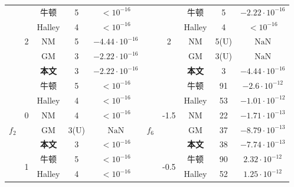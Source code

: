 \begin{center}
\begin{longtable}[!htbp]{c|c|ccc|c|c|ccc}
     \cline{2-5}\cline{7-10}
        & 	\multirow{5}{*}{2}  & 	牛顿  & 	5  & 	$< 10^{-16}$&	   & 	\multirow{5}{*}{2}  & 	牛顿  & 	5  & 	$-2.22 \cdot 10^{-16}$\\
     
        & 	   & 	Halley  & 	4  & 	$< 10^{-16}$&	   & 	   & 	Halley  & 	4  & 	$< 10^{-16}$\\
     
        & 	   & 	NM  & 	5  & 	$-4.44 \cdot 10^{-16}$&	   & 	   & 	NM  & 	5(U)  & 	$\text{NaN}$\\
     
        & 	   & 	GM  & 	3  & 	$-2.22 \cdot 10^{-16}$&	   & 	   & 	GM  & 	3(U)  & 	$\text{NaN}$\\
     
        & 	   & 	\textbf{本文}  & 	3  & 	$-2.22 \cdot 10^{-16}$&	   & 	   & 	\textbf{本文}  & 	3  & 	$-4.44 \cdot 10^{-16}$\\
     
     \cline{2-5}\cline{7-10}
     \hline


    \multirow{10}{*}{$f_2$} & 	\multirow{5}{*}{0}  & 	牛顿  & 	5  & 	$< 10^{-16}$&	\multirow{10}{*}{$f_6$}   & 	\multirow{5}{*}{-1.5}  & 	牛顿  & 	91  & 	$-2.6 \cdot 10^{-12}$\\

    & 	   & 	Halley  & 	4  & 	$< 10^{-16}$&	   & 	   & 	Halley  & 	53  & 	$-1.01 \cdot 10^{-12}$\\
 
    & 	   & 	NM  & 	4  & 	$< 10^{-16}$&	   & 	   & 	NM  & 	22  & 	$-1.71 \cdot 10^{-13}$\\
 
    & 	   & 	GM  & 	3(U)  & 	$\text{NaN}$&	   & 	   & 	GM  & 	37  & 	$-8.79 \cdot 10^{-13}$\\
 
    & 	   & 	\textbf{本文}  & 	3  & 	$< 10^{-16}$&	   & 	   & 	\textbf{本文}  & 	38  & 	$-7.74 \cdot 10^{-13}$\\
 
 \cline{2-5}\cline{7-10}
    & 	\multirow{5}{*}{1}  & 	牛顿  & 	5  & 	$< 10^{-16}$&	   & 	\multirow{5}{*}{-0.5}  & 	牛顿  & 	90  & 	$2.32 \cdot 10^{-12}$\\
 
    & 	   & 	Halley  & 	4  & 	$< 10^{-16}$&	   & 	   & 	Halley  & 	52  & 	$1.25 \cdot 10^{-12}$\\
 

\end{longtable}
\end{center}
